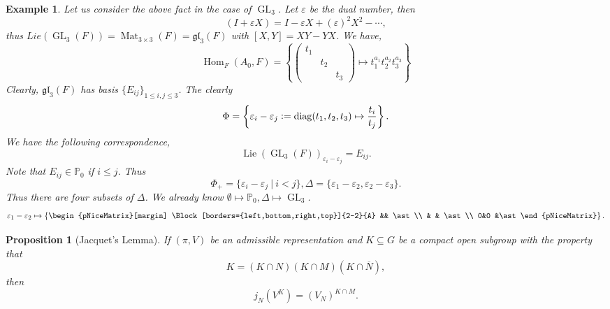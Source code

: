 \documentclass[8pt]{article}
\newtheorem{proposition}{Proposition}[section]
\newtheorem{example}{Example}[section]
\DeclareMathOperator{\GL}{GL}
\DeclareMathOperator{\Hom}{Hom}
\DeclareMathOperator{\Lie}{Lie}
\DeclareMathOperator{\Mat}{Mat}
\DeclareMathOperator{\diag}{diag}
\newcommand{\defeq}{\vcentcolon=}
\newcommand{\Para}[0]{\mathbb{P}}
\newcommand{\sep}[0]{\:|\:}
\begin{document}
\begin{example}
  Let us consider the above fact in the case of $\GL_3$. Let $\varepsilon$ be the dual number, then 
  \begin{equation*}
    (I+\varepsilon X) = I-\varepsilon X+(\varepsilon)^2X^2-\cdots,
  \end{equation*}
  thus $Lie(\GL_3(F)) = \Mat_{3\times 3}(F)=\mathfrak{gl}_3(F)$ with $[X,Y]= XY-YX$. We have,
  \begin{equation*}
    \Hom_F(A_0,F) = \left\{\begin{pmatrix}
      t_1 & \: & \:\\
      \: & t_2 & \:\\
      \: & \: & t_3
    \end{pmatrix}\mapsto t_1^{a_1}t_2^{a_2}t_3^{a_3}
    \right\}
  \end{equation*}
  Clearly, $\mathfrak{gl}_3(F)$ has basis $\{E_{ij}\}_{1\leq i,j\leq 3}$. The clearly 
  \begin{equation*}
    \Phi = \left\{\varepsilon_i-\varepsilon_j\defeq \diag(t_1,t_2,t_3)\mapsto {\frac {t_i} {t_j}}\right\}.
  \end{equation*}
  We have the following correspondence,
  \begin{equation*}
    \Lie(\GL_3(F))_{\varepsilon_i-\varepsilon_j} = E_{ij}.
  \end{equation*}
  Note that $E_{ij}\in\Para_0$ if $i\leq j$. Thus 
  \begin{equation*}
    \Phi_+=\{\varepsilon_i-\varepsilon_j\sep i< j\},\Delta = \{\varepsilon_1-\varepsilon_2,\varepsilon_2-\varepsilon_3\}.
  \end{equation*}
  Thus there are four subsets of $\Delta$. We already know $\emptyset\mapsto \Para_0,\Delta\mapsto \GL_3$. 
  \begin{equation*}
\varepsilon_1-\varepsilon_2 \mapsto \left\{
\begin{pNiceMatrix}[margin]
\Block[borders={left,bottom,right,top}]{2-2}{A} && \ast\\
& & \ast\\
0&0 &\ast
\end{pNiceMatrix}
\right\}.
\end{equation*}

\end{example}
\begin{proposition}[Jacquet's Lemma]
  \label{proposition_48}
  If $(\pi,V)$ be an admissible representation and $K\subseteq G$ be a compact open subgroup with the property that
  \begin{equation*}
     K = (K\cap N)(K\cap M)(K\cap\overline{N}),
  \end{equation*}
  then 
  \begin{equation*}
    j_N(V^K) = (V_N)^{K\cap M}.
  \end{equation*}
\end{proposition}
\end{document}
